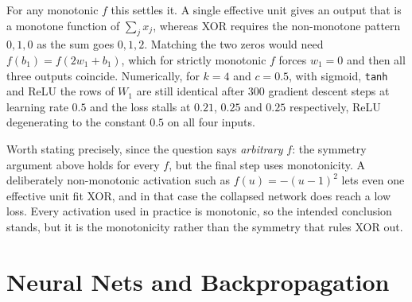 \documentclass[11pt]{article}
\begin{document}
\begin{enumerate}
        For any monotonic $f$ this settles it. A single effective unit gives an output that is a monotone
        function of $\sum_j x_j$, whereas XOR requires the non-monotone pattern $0, 1, 0$ as the sum goes
        $0, 1, 2$. Matching the two zeros would need $f(b_1) = f(2w_1 + b_1)$, which for strictly monotonic
        $f$ forces $w_1 = 0$ and then all three outputs coincide. Numerically, for $k = 4$ and $c = 0.5$, with sigmoid, \texttt{tanh} and ReLU the rows of $W_1$ are still identical after 300
        gradient descent steps at learning rate $0.5$ and the loss stalls at $0.21$, $0.25$ and $0.25$ respectively, ReLU
        degenerating to the constant $0.5$ on all four inputs.

        Worth stating precisely, since the question says \emph{arbitrary} $f$: the symmetry argument above
        holds for every $f$, but the final step uses monotonicity. A deliberately non-monotonic activation
        such as $f(u) = -(u-1)^2$ lets even one effective unit fit XOR, and in that case the collapsed
        network does reach a low loss. Every activation used in practice is monotonic, so the intended
        conclusion stands, but it is the monotonicity rather than the symmetry that rules XOR out.
\end{enumerate}

\section{Neural Nets and Backpropagation}
\end{document}
